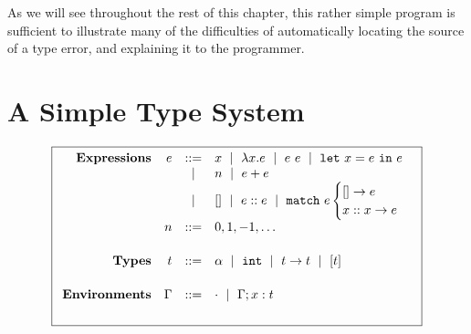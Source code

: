As we will see throughout the rest of this chapter, this rather simple
program is sufficient to illustrate many of the difficulties of
automatically locating the source of a type error, and explaining it to
the programmer.

\section{A Simple Type System}
\label{sec:intro:simple-type}

\begin{figure}[p]
\centering
\[
\boxed{
\begin{array}{rrcl}
\mathbf{Expressions}
& e & ::=    & x \spmid \efun{x}{e} \spmid \eapp{e}{e} \spmid \elet{x}{e}{e} \\
&   & \spmid & n \spmid \eplus{e}{e}\\
&   & \spmid & \enil \spmid \econs{e}{e} \spmid \elcase{e}{e}{x}{x}{e} \\[0.05in]

& n & ::= &  0, 1, -1, \ldots \\[0.2in]

\mathbf{Types}
& t & ::= & \alpha \spmid %
            \tint \spmid \tarr{t}{t} \spmid %
            \tlist{t} \\[0.2in]

\mathbf{Environments}
& \Gamma & ::= & \cdot \spmid \Gamma;x:t \\[0.2in]


\end{array}}\]
\end{figure}
